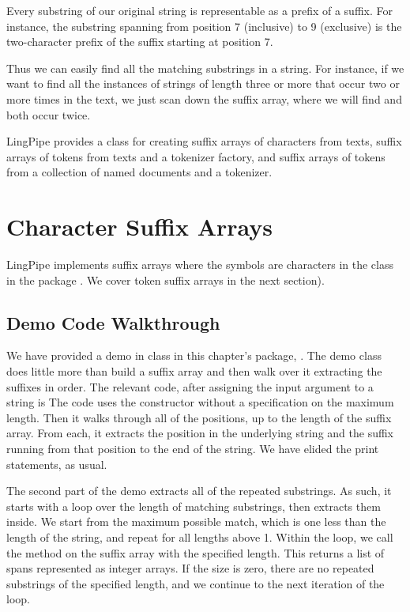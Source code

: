 Every substring of our original string is representable as a prefix
of a suffix.  For instance, the substring  spanning
from position 7 (inclusive) to 9 (exclusive) is the two-character
prefix of the suffix  starting at position 7.

Thus we can easily find all the matching substrings in a string.  For
instance, if we want to find all the instances of strings of length
three or more that occur two or more times in the text, we just scan
down the suffix array, where we will find  and
 both occur twice.  

LingPipe provides a class for creating suffix arrays of characters
from texts, suffix arrays of tokens from texts and a tokenizer
factory, and suffix arrays of tokens from a collection of named
documents and a tokenizer.


\section{Character Suffix Arrays}

LingPipe implements suffix arrays where the symbols are characters in
the class  in the package
.  We cover token suffix arrays in the
next section).

\subsection{Demo Code Walkthrough}

We have provided a demo in class  in
this chapter's package, .  
The demo class does little more than build a suffix array and then
walk over it extracting the suffixes in order.  The relevant code,
after assigning the input argument to a string  is
%
%
The code uses the constructor without a specification on the maximum
length.  Then it walks through all of the positions, up to the length
of the suffix array.  From each, it extracts the position in the
underlying string and the suffix running from that position to the end
of the string.  We have elided the print statements, as usual.

The second part of the demo extracts all of the repeated substrings.
As such, it starts with a loop over the length of matching substrings,
then extracts them inside.
%
%
We start from the maximum possible match, which is one less
than the length of the string, and repeat for all lengths above 1.
Within the loop, we call the  method on the
suffix array with the specified length.  This returns a list of
spans represented as integer arrays.  If the size is zero, there
are no repeated substrings of the specified length, and we continue
to the next iteration of the loop.  

